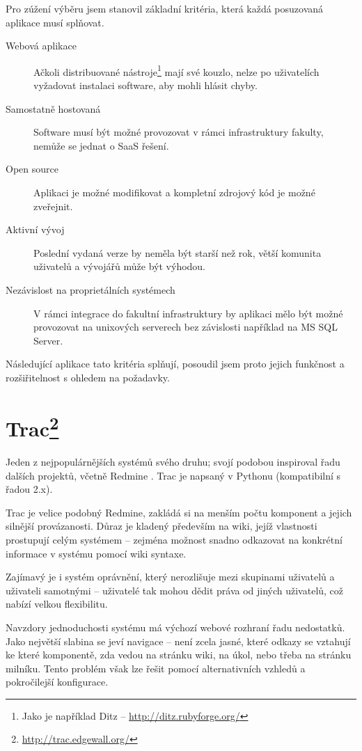 \documentclass[thesis=B,czech]{FITthesis}[2012/05/02]
\begin{document}
Pro zúžení výběru jsem stanovil základní kritéria, která každá
posuzovaná aplikace musí splňovat.

\begin{description}
\item[Webová aplikace]
  Ačkoli distribuované nástroje\footnote{Jako je například Ditz -- \url{http://ditz.rubyforge.org/}} mají své kouzlo,
  nelze po uživatelích vyžadovat instalaci software, aby mohli hlásit
  chyby.
\item[Samostatně hostovaná]
  Software musí být možné provozovat v rámci
  infrastruktury fakulty, nemůže se jednat o \gls{SaaS} řešení.
\item[Open source]
  Aplikaci je možné modifikovat a kompletní zdrojový kód
  je možné zveřejnit.
\item[Aktivní vývoj]
  Poslední vydaná verze by neměla být starší než rok,
  větší komunita uživatelů a vývojářů může být výhodou.
\item[Nezávislost na proprietálních systémech]
  V rámci integrace do
  fakultní infrastruktury by aplikaci mělo být možné provozovat na
  unixových serverech bez závislosti například na MS SQL Server.
\end{description}
Následující aplikace tato kritéria splňují, posoudil jsem proto jejich
funkčnost a rozšiřitelnost s ohledem na požadavky.

\section[Trac]{Trac\footnote{\url{http://trac.edgewall.org/}}}

Jeden z nejpopulárnějších systémů svého druhu; svojí podobou inspiroval
řadu dalších projektů, včetně Redmine \citep{TracRedMine}. Trac je
napsaný v Pythonu (kompatibilní s řadou 2.x).

Trac je velice podobný Redmine, zakládá si na menším počtu komponent a
jejich silnější provázanosti. Důraz je kladený především na wiki, jejíž
vlastnosti prostupují celým systémem -- zejména možnost snadno
odkazovat na konkrétní informace v systému pomocí wiki syntaxe.

Zajímavý je i systém oprávnění, který nerozlišuje mezi skupinami
uživatelů a uživateli samotnými -- uživatelé tak mohou dědit práva od
jiných uživatelů, což nabízí velkou flexibilitu.

Navzdory jednoduchosti systému má výchozí webové rozhraní řadu
nedostatků. Jako největší slabina se jeví navigace -- není zcela jasné,
které odkazy se vztahují ke které komponentě, zda vedou na stránku wiki,
na úkol, nebo třeba na stránku milníku. Tento problém však lze řešit
pomocí alternativních vzhledů a pokročilejší konfigurace.
\end{document}
